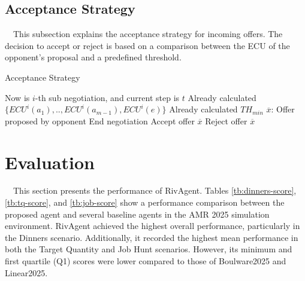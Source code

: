 \documentclass{article}
\begin{document}
\subsection{Acceptance Strategy}
　This subsection explains the acceptance strategy for incoming offers.
The decision to accept or reject is based on a comparison between the ECU of the opponent's proposal and a predefined threshold.

\begin{algorithm}[H]
  \caption{Acceptance Strategy}
  \label{al:accept-strategy}
  \begin{algorithmic}[1]\scriptsize{
	\Require Now is $i$-th sub negotiation, and current step is $t$
	\Require Already calculated $\{ECU^i(a_1),..,ECU^i(a_{m-1}),ECU^i(e)\}$
	\Require Already calculated $TH_{min}$
	\Require ${\overline{x}}$: Offer proposed by opponent
		\State End negotiation
	\Else
			\State Accept offer ${\overline{x}}$
		\Else
			\State Reject offer ${\overline{x}}$
		\EndIf
	\EndIf
	}\end{algorithmic}
\end{algorithm}

\section{Evaluation}
　This section presents the performance of RivAgent.
Tables \ref{tb:dinners-score}, \ref{tb:tq-score}, and \ref{tb:job-score} show a performance comparison between the proposed agent and several baseline agents in the AMR 2025 simulation environment.
RivAgent achieved the highest overall performance, particularly in the Dinners scenario.
Additionally, it recorded the highest mean performance in both the Target Quantity and Job Hunt scenarios.
However, its minimum and first quartile (Q1) scores were lower compared to those of Boulware2025 and Linear2025.
\end{document}
